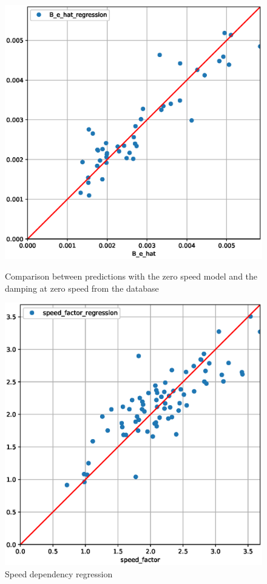 \begin{figure}[H]
\centering
\begin{minipage}{.5\textwidth}
  \centering
  \includegraphics[width=\columnwidth]{figures/B_e_hat0_regression.eps}
    \caption{Comparison between predictions with the zero speed model and the damping at zero speed from the database}
    \label{fig:B_e_hat0_regression}
\end{minipage}%
\begin{minipage}{.5\textwidth}
  \centering
 \includegraphics[width=\columnwidth]{figures/B_e_factor_regression.eps}
    \caption{Speed dependency regression}
    \label{fig:B_e_factor_regression}
\end{minipage}
\end{figure}


